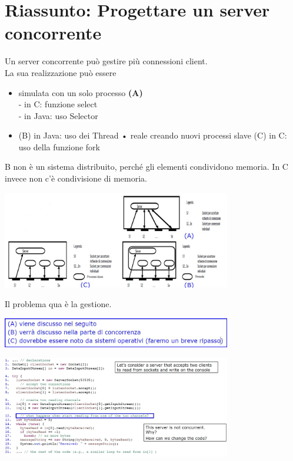 \section{Riassunto: Progettare un server concorrente}
Un server concorrente può gestire più connessioni client.
\\La sua realizzazione può essere
\begin{itemize}
    \item simulata con un solo processo \textbf{(A)} 
    \\- in C: funzione select
    \\- in Java: uso Selector
    \item (B) in Java: uso dei Thread
• reale creando nuovi processi slave
(C) in C: uso della funzione fork
\end{itemize}
B non è un sistema distribuito, perché gli elementi condividono memoria. In C invece non c'è condivisione di memoria.
\begin{center}
    \includegraphics[width=0.75\textwidth]{img/serverConcorrenti1.jpg}
\end{center}
Il problema qua è la gestione.

\begin{center}
    \includegraphics[width=0.75\textwidth]{img/dacanc1.jpg}
\end{center}

\begin{center}
    \includegraphics[width=0.75\textwidth]{img/serverConcorrenti2.jpg}
\end{center}

